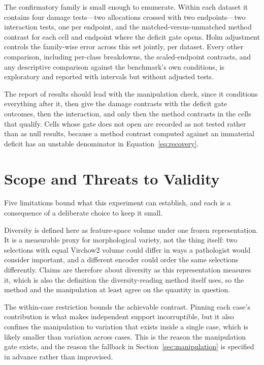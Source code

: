 \documentclass[11pt]{article}
\begin{document}
The confirmatory family is small enough to enumerate. Within each dataset it contains four damage tests---two allocations crossed with two endpoints---two interaction tests, one per endpoint, and the matched-versus-unmatched method contrast for each cell and endpoint where the deficit gate opens. Holm adjustment controls the family-wise error across this set jointly, per dataset. Every other comparison, including per-class breakdowns, the scaled-endpoint contrasts, and any descriptive comparison against the benchmark's own conditions, is exploratory and reported with intervals but without adjusted tests.

The report of results should lead with the manipulation check, since it conditions everything after it, then give the damage contrasts with the deficit gate outcomes, then the interaction, and only then the method contrasts in the cells that qualify. Cells whose gate does not open are recorded as not tested rather than as null results, because a method contrast computed against an immaterial deficit has an unstable denominator in Equation~\eqref{eq:recovery}.

\section{Scope and Threats to Validity}
\label{sec:scope}
Five limitations bound what this experiment can establish, and each is a consequence of a deliberate choice to keep it small.

Diversity is defined here as feature-space volume under one frozen representation. It is a measurable proxy for morphological variety, not the thing itself: two selections with equal Virchow2 volume could differ in ways a pathologist would consider important, and a different encoder could order the same selections differently. Claims are therefore about diversity as this representation measures it, which is also the definition the diversity-reading method itself uses, so the method and the manipulation at least agree on the quantity in question.

The within-case restriction bounds the achievable contrast. Pinning each case's contribution is what makes independent support incorruptible, but it also confines the manipulation to variation that exists inside a single case, which is likely smaller than variation across cases. This is the reason the manipulation gate exists, and the reason the fallback in Section~\ref{sec:manipulation} is specified in advance rather than improvised.
\end{document}
